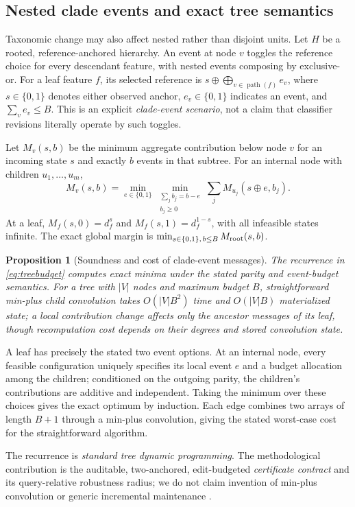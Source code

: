\documentclass[conference]{IEEEtran}
\newtheorem{proposition}{Proposition}
\begin{document}
\subsection{Nested clade events and exact tree semantics}
Taxonomic change may also affect nested rather than disjoint units. Let $H$ be a rooted, reference-anchored hierarchy. An event at node $v$ toggles the reference choice for every descendant feature, with nested events composing by exclusive-or. For a leaf feature $f$, its selected reference is $s\oplus\bigoplus_{v\in\operatorname{path}(f)} e_v$, where $s\in\{0,1\}$ denotes either observed anchor, $e_v\in\{0,1\}$ indicates an event, and $\sum_v e_v\le B$. This is an explicit \emph{clade-event scenario}, not a claim that classifier revisions literally operate by such toggles.

Let $M_v(s,b)$ be the minimum aggregate contribution below node $v$ for an incoming state $s$ and exactly $b$ events in that subtree. For an internal node with children $u_1,\ldots,u_m$,
\begin{equation}
 M_v(s,b)=\min_{e\in\{0,1\}}\min_{\substack{\sum_j b_j=b-e\\b_j\ge0}}
 \sum_j M_{u_j}(s\oplus e,b_j).
 \label{eq:treebudget}
\end{equation}
At a leaf, $M_f(s,0)=d_f^s$ and $M_f(s,1)=d_f^{1-s}$, with all infeasible states infinite. The exact global margin is $\min_{s\in\{0,1\},\,b\le B}M_{\rm root}(s,b)$.
\begin{proposition}[Soundness and cost of clade-event messages]
The recurrence in \eqref{eq:treebudget} computes exact minima under the stated parity and event-budget semantics. For a tree with $|V|$ nodes and maximum budget $B$, straightforward min-plus child convolution takes $O(|V|B^2)$ time and $O(|V|B)$ materialized state; a local contribution change affects only the ancestor messages of its leaf, though recomputation cost depends on their degrees and stored convolution state.
\end{proposition}
\begin{IEEEproof}
A leaf has precisely the stated two event options. At an internal node, every feasible configuration uniquely specifies its local event $e$ and a budget allocation among the children; conditioned on the outgoing parity, the children's contributions are additive and independent. Taking the minimum over these choices gives the exact optimum by induction. Each edge combines two arrays of length $B+1$ through a min-plus convolution, giving the stated worst-case cost for the straightforward algorithm.
\end{IEEEproof}
The recurrence is \emph{standard tree dynamic programming}. The methodological contribution is the auditable, two-anchored, edit-budgeted \emph{certificate contract} and its query-relative robustness radius; we do not claim invention of min-plus convolution or generic incremental maintenance \cite{kara2024,budiu2023}.
\end{document}
